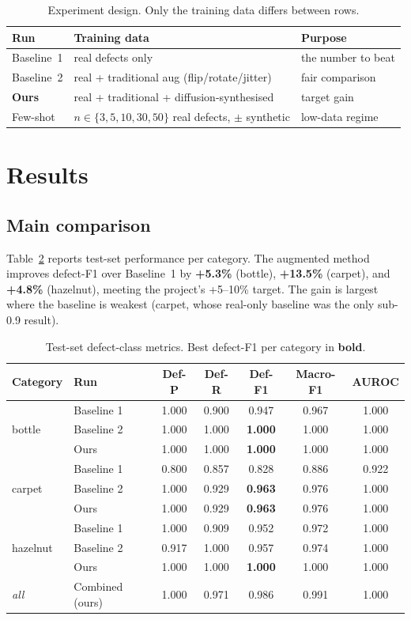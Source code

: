 \documentclass[11pt]{article}
\begin{document}
\begin{table}[h]
\centering
\caption{Experiment design. Only the training data differs between rows.}
\label{tab:design}
\begin{tabular}{lll}
\toprule
Run & Training data & Purpose \\
\midrule
Baseline~1 & real defects only & the number to beat \\
Baseline~2 & real + traditional aug (flip/rotate/jitter) & fair comparison \\
\textbf{Ours} & real + traditional + diffusion-synthesised & target gain \\
Few-shot & $n\in\{3,5,10,30,50\}$ real defects, $\pm$ synthetic & low-data regime \\
\bottomrule
\end{tabular}
\end{table}

\section{Results}

\subsection{Main comparison}
Table~\ref{tab:main} reports test-set performance per category. The augmented
method improves defect-F1 over Baseline~1 by \textbf{+5.3\%} (bottle),
\textbf{+13.5\%} (carpet), and \textbf{+4.8\%} (hazelnut), meeting the project's
+5--10\% target. The gain is largest where the baseline is weakest
(carpet, whose real-only baseline was the only sub-0.9 result).

\begin{table}[h]
\centering
\caption{Test-set defect-class metrics. Best defect-F1 per category in
\textbf{bold}.}
\label{tab:main}
\begin{tabular}{llccccc}
\toprule
Category & Run & Def-P & Def-R & Def-F1 & Macro-F1 & AUROC \\
\midrule
\multirow{3}{*}{bottle}
 & Baseline 1 & 1.000 & 0.900 & 0.947 & 0.967 & 1.000 \\
 & Baseline 2 & 1.000 & 1.000 & \textbf{1.000} & 1.000 & 1.000 \\
 & Ours       & 1.000 & 1.000 & \textbf{1.000} & 1.000 & 1.000 \\
\midrule
\multirow{3}{*}{carpet}
 & Baseline 1 & 0.800 & 0.857 & 0.828 & 0.886 & 0.922 \\
 & Baseline 2 & 1.000 & 0.929 & \textbf{0.963} & 0.976 & 1.000 \\
 & Ours       & 1.000 & 0.929 & \textbf{0.963} & 0.976 & 1.000 \\
\midrule
\multirow{3}{*}{hazelnut}
 & Baseline 1 & 1.000 & 0.909 & 0.952 & 0.972 & 1.000 \\
 & Baseline 2 & 0.917 & 1.000 & 0.957 & 0.974 & 1.000 \\
 & Ours       & 1.000 & 1.000 & \textbf{1.000} & 1.000 & 1.000 \\
\midrule
\textit{all} & Combined (ours) & 1.000 & 0.971 & 0.986 & 0.991 & 1.000 \\
\bottomrule
\end{tabular}
\end{table}
\end{document}

